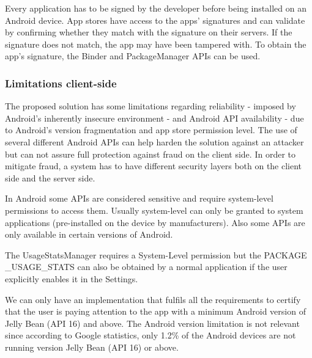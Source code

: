 Every application has to be signed by the developer before being installed on an Android device. App 
stores have access to the apps' signatures and can validate by confirming whether they match with the 
signature on their servers. If the signature does not match, the app may have been tampered with. To obtain the app's signature, the Binder and PackageManager APIs can be used.

\subsubsection{Limitations client-side}

The proposed solution has some limitations regarding reliability - imposed by Android's inherently 
insecure environment - and Android API availability - due to Android's version fragmentation and app 
store permission level. The use of several different Android APIs can help harden the solution 
against an attacker but can not assure full protection against fraud on the client side. In order to 
mitigate fraud, a system has to have different security layers both on the client side and the server side. 

In Android some APIs are considered sensitive and require system-level permissions to access them. 
Usually system-level can only be granted to system applications (pre-installed on the device by 
manufacturers). Also some APIs are only available in certain versions of Android. %



The UsageStatsManager requires a System-Level permission but the PACKAGE \_USAGE\_STATS 
can also be obtained by a normal application if the user explicitly enables it in the Settings.

We can only have an implementation that fulfils all the requirements to certify that the user is paying 
attention to the app with a minimum Android version of Jelly Bean (API 16) and above. The Android 
version limitation is not relevant since according to Google statistics, only 1.2\% of the Android devices are not running version Jelly Bean (API 16) or above. %

